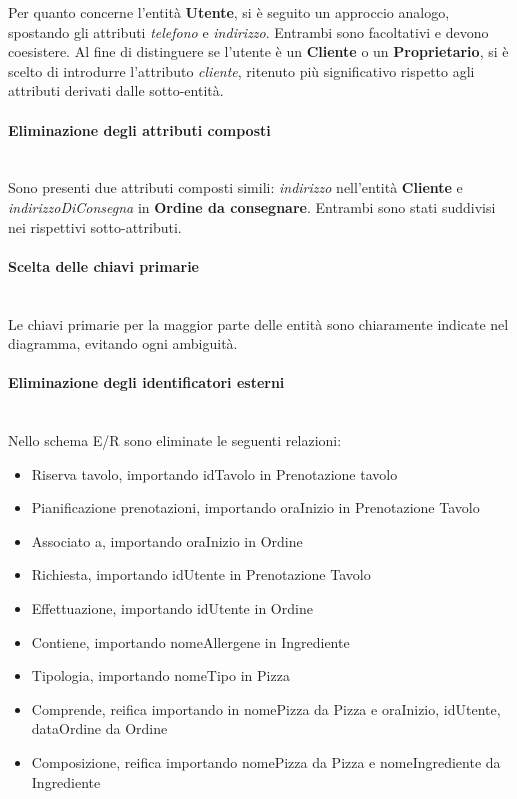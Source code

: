\documentclass[a4paper,12pt, oneside]{article}
\begin{document}
Per quanto concerne l'entità \textbf{Utente}, si è seguito un
approccio analogo, spostando gli attributi \textit{telefono}
e \textit{indirizzo}. Entrambi sono facoltativi e devono
coesistere. Al fine di distinguere se l'utente è un
\textbf{Cliente} o un \textbf{Proprietario}, si è scelto di
introdurre l'attributo \textit{cliente}, ritenuto più
significativo rispetto agli attributi derivati dalle
sotto-entità.

\paragraph{Eliminazione degli attributi composti}
\hphantom{A}\\    %
Sono presenti due attributi composti simili: \textit{indirizzo}
nell'entità \textbf{Cliente} e \textit{indirizzoDiConsegna} in
\textbf{Ordine da consegnare}. Entrambi sono stati suddivisi
nei rispettivi sotto-attributi.

\paragraph{Scelta delle chiavi primarie}
\hphantom{A}\\    %
Le chiavi primarie per la maggior parte delle entità sono
chiaramente indicate nel diagramma, evitando ogni ambiguità.

\paragraph{Eliminazione degli identificatori esterni}
\hphantom{A}\\    %
Nello schema E/R sono eliminate le seguenti relazioni:
\begin{itemize}
    \item Riserva tavolo, importando idTavolo in Prenotazione tavolo
    \item Pianificazione prenotazioni, importando oraInizio in Prenotazione Tavolo
    \item Associato a, importando oraInizio in Ordine
    \item Richiesta, importando idUtente in Prenotazione Tavolo
    \item Effettuazione, importando idUtente in Ordine
    \item Contiene, importando nomeAllergene in Ingrediente
    \item Tipologia, importando nomeTipo in Pizza
    \item Comprende, reifica importando in nomePizza da Pizza e oraInizio, idUtente, dataOrdine da Ordine
    \item Composizione, reifica importando nomePizza da Pizza e nomeIngrediente da Ingrediente
\end{itemize}
\end{document}

